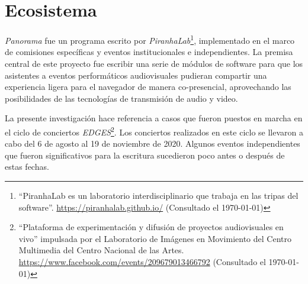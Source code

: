
\section*{Ecosistema}

\textit{Panorama} \citep{panorama} fue un programa escrito por \textit{PiranhaLab}\footnote{``PiranhaLab es un laboratorio interdisciplinario que trabaja en las tripas del software''. \url{https://piranhalab.github.io/} (Consultado el \today)}, implementado en el marco de comisiones específicas y eventos institucionales e independientes. La premisa central de este proyecto fue escribir una serie de módulos de software para que los asistentes a eventos performáticos audiovisuales pudieran compartir una experiencia ligera para el navegador de manera co-presencial, aprovechando las posibilidades de las tecnologías de transmisión de audio y video. %

La presente investigación hace referencia a casos que fueron puestos en marcha en el ciclo de conciertos \textit{EDGES}\footnote{``Plataforma de experimentación y difusión de proyectos audiovisuales en vivo'' impulsada por el Laboratorio de Imágenes en Movimiento del Centro Multimedia del Centro Nacional de las Artes. \url{https://www.facebook.com/events/209679013466792} (Consultado el \today)}. Los conciertos realizados en este ciclo se llevaron a cabo del 6 de agosto al 19 de noviembre de 2020. Algunos eventos independientes que fueron significativos para la escritura sucedieron poco antes o después de estas fechas. 	




